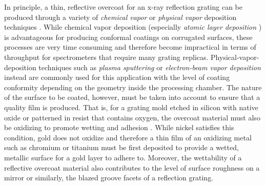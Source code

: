 In principle, a thin, reflective overcoat for an x-ray reflection grating can be produced through a variety of \emph{chemical vapor} or \emph{physical vapor} deposition techniques \cite{Franssila10}. 
While chemical vapor deposition (especially \emph{atomic layer deposition} \cite{George10}) is advantageous for producing conformal coatings on corrugated surfaces, these processes are very time consuming and therefore become impractical in terms of throughput for spectrometers that require many grating replicas. 
Physical-vapor-deposition techniques such as \emph{plasma sputtering} or \emph{electron-beam vapor deposition} \cite{Singh05} instead are commonly used for this application with the level of coating conformity depending on the geometry inside the processing chamber. 
The nature of the surface to be coated, however, must be taken into account to ensure that a quality film is produced. 
That is, for a grating mold etched in silicon with native oxide or patterned in resist that contains oxygen, the overcoat material must also be oxidizing to promote wetting and adhesion \cite{Trolier-McKinstry17}. 
While nickel satisfies this condition, gold does not oxidize and therefore a thin film of an oxidizing metal such as chromium or titanium must be first deposited to provide a wetted, metallic surface for a gold layer to adhere to. 
Moreover, the wettability of a reflective overcoat material also contributes to the level of surface roughness on a mirror or similarly, the blazed groove facets of a reflection grating. 

